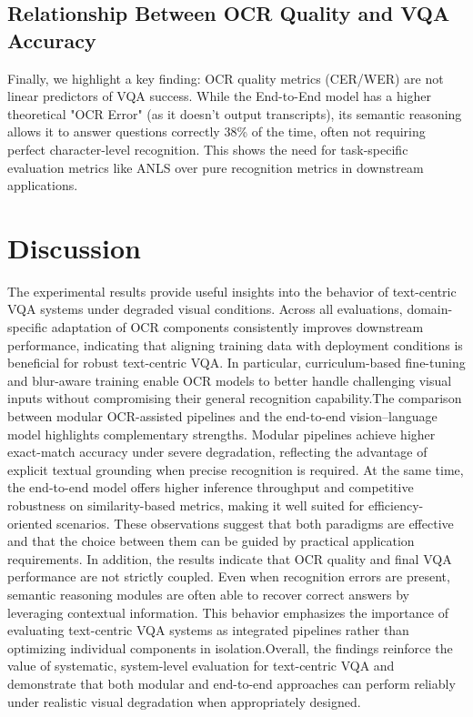 \documentclass[conference]{IEEEtran}
\begin{document}
\subsection{Relationship Between OCR Quality and VQA Accuracy}

Finally, we highlight a key finding: OCR quality metrics (CER/WER) are not linear predictors of VQA success. While the End-to-End model has a higher theoretical "OCR Error" (as it doesn't output transcripts), its semantic reasoning allows it to answer questions correctly 38\% of the time, often not requiring perfect character-level recognition. This shows the need for task-specific evaluation metrics like ANLS over pure recognition metrics in downstream applications.


\section{Discussion}

The experimental results provide useful insights into the behavior of text-centric VQA systems under degraded visual conditions. Across all evaluations, domain-specific adaptation of OCR components consistently improves downstream performance, indicating that aligning training data with deployment conditions is beneficial for robust text-centric VQA. In particular, curriculum-based fine-tuning and blur-aware training enable OCR models to better handle challenging visual inputs without compromising their general recognition capability.The comparison between modular OCR-assisted pipelines and the end-to-end vision--language model highlights complementary strengths. Modular pipelines achieve higher exact-match accuracy under severe degradation, reflecting the advantage of explicit textual grounding when precise recognition is required. At the same time, the end-to-end model offers higher inference throughput and competitive robustness on similarity-based metrics, making it well suited for efficiency-oriented scenarios. These observations suggest that both paradigms are effective and that the choice between them can be guided by practical application requirements.
In addition, the results indicate that OCR quality and final VQA performance are not strictly coupled. Even when recognition errors are present, semantic reasoning modules are often able to recover correct answers by leveraging contextual information. This behavior emphasizes the importance of evaluating text-centric VQA systems as integrated pipelines rather than optimizing individual components in isolation.Overall, the findings reinforce the value of systematic, system-level evaluation for text-centric VQA and demonstrate that both modular and end-to-end approaches can perform reliably under realistic visual degradation when appropriately designed.
\end{document}
